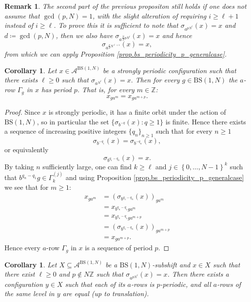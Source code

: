 \documentclass[letterpaper,10pt]{article}
\theoremstyle{plain}
\newtheorem{corollary}[theorem]{Corollary}
\newtheorem*{remark*}{Remark}
\newcommand{\BS}[1][N]{\mathrm{BS}(1,#1)}
\begin{document}
	\begin{remark*} The second part of the previous propositon still holds if one does not assume that $\gcd(p,N)=1$, with the slight alteration of requiring $i\ge \ell+1$ instead of $i\ge \ell$. To prove this it is sufficient to note that $\sigma_{a^{pN^\ell}}(x)=x$ and $d\coloneqq \gcd(p,N)$, then we also have $\sigma_{a^{\frac{N}{d}pN^\ell}}(x)=x$ and hence 
		$$
		\sigma_{a^{\frac{p}{d}N^{\ell+1}}}(x)=x,
		$$
		from which we can apply Proposition \ref{prop.bs_periodicity_p_generalcase}.
	\end{remark*}
	
	\begin{corollary} Let $x\in \mathcal{A}^{\BS}$ be a strongly periodic configuration such that there exists $\ell\ge 0$ such that $\sigma_{a^{N^{\ell}}}(x)=x.$ Then for every $g\in \BS$ the $a$-row $\Gamma_g$ in $x$ has period $p$. That is, for every $m\in \mathbb{Z}$:
		$$
		x_{ga^{m}}=x_{ga^{m+p}}.
		$$
	\end{corollary}
	\begin{proof}
		Since $x$ is strongly periodic, it has a finite orbit under the action of $\BS$, so in particular the set $\{ \sigma_{b^{-q}}(x): q\ge 1 \}$ is finite. Hence there exists a sequence of increasing positive integers $\{q_n\}_{n\ge 1}$ such that for every $n\ge1$
		$$
		\sigma_{b^{-q_1}}(x)=\sigma_{b^{-q_n}}(x),
		$$
		or equivalently
		$$
		\sigma_{b^{q_1-q_n}}(x)=x.
		$$
		By taking $n$ sufficiently large, one can find $k\ge \ell $ and $j\in\left\{0,\ldots,N-1\right\}^k$ such that $b^{q_n-q_1}g\in \Gamma_{k}^{(j)}$ and using Proposition \ref{prop.bs_periodicity_p_generalcase} we see that for $m\ge 1:$
		\begin{equation*}
		\begin{aligned}
		x_{ga^{m}}&=(\sigma_{b^{q_1-q_n}}(x))_{ga^{m}} \\
		&=x_{b^{q_n-q_1}ga^{m}}\\
		&=x_{b^{q_n-q_1}ga^{m+p}} \\
		&=(\sigma_{b^{q_1-q_n}}(x))_{ga^{m+p}}\\
		&=x_{ga^{m+p}}.
		\end{aligned}
		\end{equation*}
		Hence every $a$-row $\Gamma_g$ in $x$ is a sequence of period $p$.
	\end{proof}
	\begin{corollary}
		Let $X\subseteq \mathcal{A}^{\BS}$ be a $\BS$-subshift and $x\in X$ such that there exist $\ell\ge 0$ and $p\notin N\mathbb{Z}$ such that $\sigma_{a^{pN^\ell}}(x)=x$. Then there exists a configuration $y\in X$ such that each of its $a$-rows is $p$-periodic, and all $a$-rows of the same level in $y$ are equal (up to translation). 
	\end{corollary}
\end{document}
